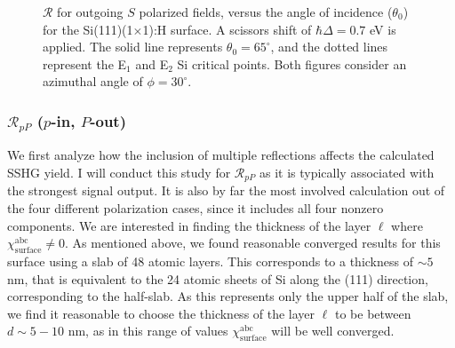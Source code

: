 \begin{figure}[H]
\centering
{}\hfill
{}
\caption{$\mathcal{R}$ for outgoing $S$ polarized fields, versus the angle of
incidence ($\theta_{0}$) for the Si(111)(1$\times$1):H surface. A scissors shift
of $\hbar\Delta = 0.7$ eV is applied. The solid line represents $\theta_{0} =
65^{\circ}$, and the dotted lines represent the E$_{1}$ and E$_{2}$ Si critical
points. Both figures consider an azimuthal angle of $\phi = 30^{\circ}$.}
\label{fig:1x1rS3d}
\end{figure}



\subsubsection{\texorpdfstring{$\mathcal{R}_{pP}$}{RpP} ($p$-in, $P$-out)}
\label{sec:1x1RpP}

We first analyze how the inclusion of multiple reflections affects the
calculated SSHG yield. I will conduct this study for $\mathcal{R}_{pP}$ as it is
typically associated with the strongest signal output. It is also by far the
most involved calculation out of the four different polarization cases, since it
includes all four nonzero components. We are interested in finding the thickness
of the layer $\ell$ where $\chi^{\mathrm{abc}}_{\mathrm{surface}} \ne 0$. As
mentioned above, we found reasonable converged results for this surface using a
slab of 48 atomic layers. This corresponds to a thickness of $\sim 5$ nm, that
is equivalent to the 24 atomic sheets of Si along the (111) direction,
corresponding to the half-slab. As this represents only the upper half of the
slab, we find it reasonable to choose the thickness of the layer $\ell$ to be
between $d\sim 5-10$ nm, as in this range of values
$\chi^{\mathrm{abc}}_{\mathrm{surface}}$ will be well converged.

